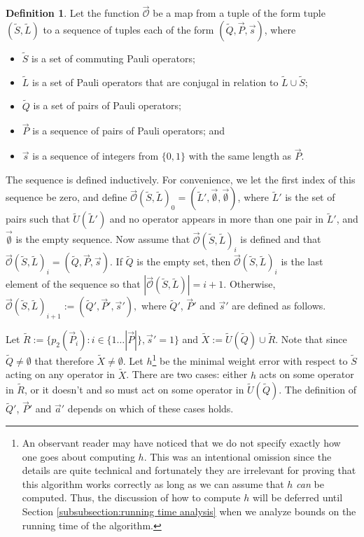 \documentclass{amsbook}
\theoremstyle{plain}
\theoremstyle{definition}
\newtheorem{definition}{Definition}
\theoremstyle{remark}
\newcommand{\lst}{\vec}
\newcommand{\set}{\tilde}
\newcommand{\optimizer}{\lst{\mathcal{O}}}
\begin{document}
\begin{definition}
Let the function $\optimizer$ be a map from a tuple of the form tuple $(\set S,\set L)$ to a sequence of tuples each of the form $(\set Q,\lst P,\lst s)$, where
\begin{itemize}
\item $\set S$ is a set of commuting Pauli operators;
\item $\set L$ is a set of Pauli operators that are conjugal in relation to $\set L\cup\set S$;
\item $\set Q$ is a set of pairs of Pauli operators;
\item $\lst P$ is a sequence of pairs of Pauli operators; and
\item $\lst s$ is a sequence of integers from $\{0,1\}$ with the same length as $\lst P$.
\end{itemize}

The sequence is defined inductively.  For convenience, we let the first index of this sequence be zero, and define $\optimizer(\set S,\set L)_0=(\set L',\lst\emptyset,\lst\emptyset)$, where $\set L'$ is the set of pairs such that $\set U(\set L')$ and no operator appears in more than one pair in $\set L'$, and $\lst\emptyset$ is the empty sequence.  Now assume that $\optimizer(\set S,\set L)_i$ is defined and that $\optimizer(\set S,\set L)_i=(\set Q,\lst P,\lst s)$.  If $\set Q$ is the empty set, then $\optimizer(\set S,\set L)_i$ is the last element of the sequence so that $|\optimizer(\set S,\set L)|=i+1$.  Otherwise, $\optimizer(\set S,\set L)_{i+1}:=(\set Q',\lst P',\lst s'),$ where $\set Q'$, $\lst P'$ and $\lst s'$ are defined as follows.

Let $\set R:=\{p_2(\lst P_i):i\in\{1\dots |\lst P|\},\lst s'=1\}$ and $\set X:=\set U(\set Q)\cup\set R$.  Note that since $\set Q\ne\emptyset$ that therefore $\set X\ne\emptyset$.  Let $h$\footnote{An observant reader may have noticed that we do not specify exactly how one goes about computing $h$.  This was an intentional omission since the details are quite technical and fortunately they are irrelevant for proving that this algorithm works correctly as long as we can assume that $h$ \emph{can} be computed.  Thus, the discussion of how to compute $h$ will be deferred until Section \ref{subsubsection:running time analysis} when we analyze bounds on the running time of the algorithm.} be the minimal weight error with respect to $\set S$ acting on any operator in $\set X$.  There are two cases: either $h$ acts on some operator in $\set R$, or it doesn't and so must act on some operator in $\set U(\set Q)$.  The definition of $\set Q'$, $\lst P'$ and $\lst a'$ depends on which of these cases holds.


\end{definition}
\end{document}
